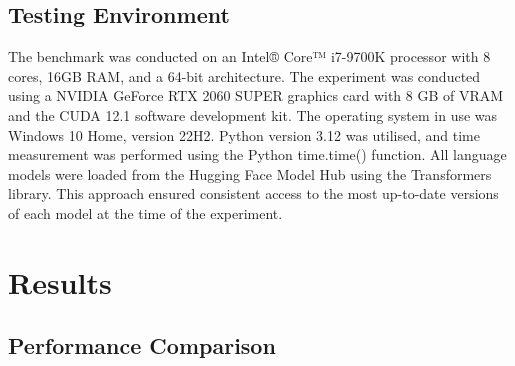 \documentclass[12pt,a4paper]{article}
\begin{document}
	\subsection{Testing Environment}
	The benchmark was conducted on an Intel® Core™ i7-9700K processor with 8 cores, 16GB RAM, and a 64-bit architecture. The experiment was conducted using a NVIDIA GeForce RTX 2060 SUPER graphics card with 8 GB of VRAM and the CUDA 12.1 software development kit.  The operating system in use was Windows 10 Home, version 22H2. Python version 3.12 was utilised, and time measurement was performed using the Python time.time() function. All language models were loaded from the Hugging Face Model Hub using the Transformers library. This approach ensured consistent access to the most up-to-date versions of each model at the time of the experiment.

	
	\section{Results}
	\subsection{Performance Comparison}
	
	\newcommand{\scorecolor}[1]{%
		\ifnum#1=5\cellcolor{excellent}5\else
		\ifnum#1=4\cellcolor{good}4\else
		\ifnum#1=3\cellcolor{fair}3\else
		\ifnum#1=2\cellcolor{poor}2\else
		\cellcolor{bad}1\fi\fi\fi\fi
	}
	
\newcommand{\runtimecolor}[2]{%
	\ifdim#1pt<#2pt
	\cellcolor{excellent!50}#1
	\else
	\ifdim#1pt<2#2pt
	\cellcolor{good!50}#1
	\else
	\ifdim#1pt<3#2pt
	\cellcolor{fair!50}#1
	\else
	\ifdim#1pt<4#2pt
	\cellcolor{poor!50}#1
	\else
	\cellcolor{bad!50}#1
	\fi
	\fi
	\fi
	\fi
}
\end{document}

